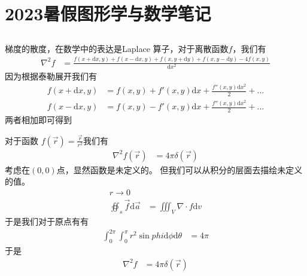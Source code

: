 \ifx\allfiles\undefined


\chapter{2023暑假图形学与数学笔记}
\section{}
\else
\fi

\begin{thm}[离散函数的梯度的散度的计算方式]
梯度的散度，在数学中的表达是Laplace 算子，对于离散函数$ f $，我们有
\begin{align*}
\nabla^2 f &= \frac{f(x+\mathrm{d}x,y) + f(x-\mathrm{d}x,y) + f(x,y+\mathrm{d}y)+ f(x,y-\mathrm{d}y)  - 4f(x,y) }{\mathrm{d}x^2 }  
\end{align*}
因为根据泰勒展开我们有
\begin{align*}
f(x+\mathrm{d}x ,y) &=  f(x,y) + f'(x,y)\mathrm{d}x + \frac{f''(x,y) \mathrm{d}x^2}{2}  +\ldots\\
f(x-\mathrm{d}x ,y) &=  f(x,y) - f'(x,y)\mathrm{d}x + \frac{f''(x,y) \mathrm{d}x^2}{2}  +\ldots
\end{align*}	
两者相加即可得到
\end{thm}

\begin{thm}[$ f(\vec r) = \frac{\vec r}{r^3}$的梯度的散度 ]
		对于函数  $f(\vec r) = \frac{\vec r}{r^2}$我们有
		\begin{align*}
				\nabla^2 f(\vec r) &=  4\pi \delta (\vec r)  
		\end{align*}
		考虑在$ (0,0) $点，显然函数是未定义的。
		但我们可以从积分的层面去描绘未定义的值。
		\begin{align*}
			r \to  0 \\	
			\oiint_s \vec f \mathrm{d}   \vec a  &= \iiint_V \nabla \cdot f \mathrm{d} v   
		\end{align*}
		于是我们对于原点有有 
		\begin{align*}
			\int_{0}^{ 2\pi } \int_{0}^{ \pi } r^2\sin phi\mathrm{d}  \phi \mathrm{d}  \theta&=   4\pi 
		\end{align*}
		于是
		\begin{align*}
							\nabla ^2 f &=  4\pi \delta (\vec r)
		\end{align*}
		
\end{thm}

